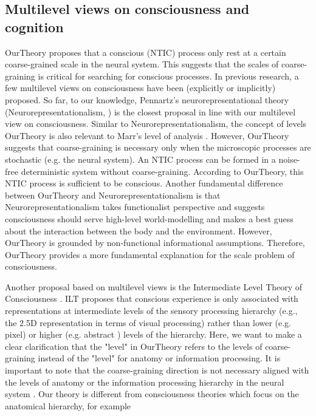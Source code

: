 \documentclass[utf8]{article}
\begin{document}
        \subsection{Multilevel views on consciousness and cognition}
    		\ac{OurTheory} proposes that a conscious (NTIC) process only rest at a certain coarse-grained scale in the neural system. This suggests that the scales of coarse-graining is critical for searching for conscious processes. In previous research, a few multilevel views on consciousness have been (explicitly or implicitly) proposed. So far, to our knowledge, Pennartz's neurorepresentational theory (Neurorepresentationalism, \cite{pennartz2018consciousness,pennartz2015brain}) is the closest proposal in line with our multilevel view on consciousness. Similar to Neurorepresentationalism, the concept of levels \ac{OurTheory} is also relevant to Marr's level of analysis \citep{marr1982vision, pennartz2015brain, pennartz2018consciousness}. 
    		However, \ac{OurTheory} suggests that coarse-graining is necessary only when the microscopic processes are stochastic (e.g. the neural system). An NTIC process can be formed in a noise-free deterministic system without coarse-graining. According to \ac{OurTheory}, this NTIC process is sufficient to be conscious. 
    		Another fundamental difference between \ac{OurTheory} and Neurorepresentationalism is that Neurorepresentationalism takes functionalist perspective and suggests consciousness should serve high-level world-modelling and makes a best guess about the interaction between the body and the environment. 
    		However, \ac{OurTheory} is grounded by non-functional informational assumptions. Therefore, \ac{OurTheory} provides a more fundamental explanation for the scale problem of consciousness. 
    		
    		Another proposal based on multilevel views is the Intermediate Level Theory of Consciousness \citep[ILT]{prinz2007intermediate, jackendoff1987consciousness}. ILT proposes that conscious experience is only associated with representations at intermediate levels of the sensory processing hierarchy (e.g., the 2.5D representation in terms of visual processing) rather than lower (e.g. pixel) or higher (e.g. abstract ) levels of the hierarchy. 
    		Here, we want to make a clear clarification that the "level" in \ac{OurTheory} refers to the levels of coarse-graining instead of the "level" for anatomy or information processing. It is important to note that the coarse-graining direction is not necessary aligned with the levels of anatomy or the information processing hierarchy in the neural system . Our theory is different from consciousness theories which focus on the anatomical hierarchy, for example 
    		
\end{document}

